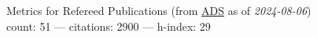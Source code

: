 Metrics for Refereed Publications (from \href{\adsurl}{ADS} as of \textit{2024-08-06}) \\count: 51 --- citations: 2900 --- h-index: 29
